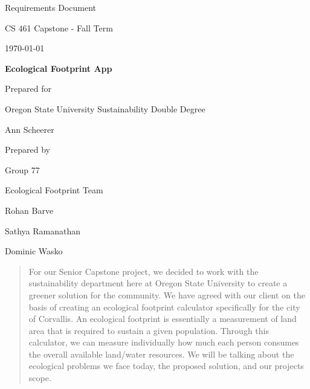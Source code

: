 \documentclass[onecolumn, draftclsnofoot,10pt, compsoc, tikz]{IEEEtran}
\def \CapstoneTeamName{		Ecological Footprint Team}
\def \CapstoneTeamNumber{		77}
\def \GroupMemberOne{			Rohan Barve}
\def \GroupMemberTwo{			Sathya Ramanathan}
\def \GroupMemberThree{			Dominic Wasko}
\def \CapstoneProjectName{		Ecological Footprint App}
\def \CapstoneSponsorCompany{	Oregon State University Sustainability Double Degree}
\def \CapstoneSponsorPerson{		Ann Scheerer}
\def \DocType{Requirements Document}
\newcommand{\NameSigPair}[1]{\par
\makebox[2.75in][r]{#1} \hfil 	\makebox[3.25in]{\makebox[2.25in]{\hrulefill} \hfill		\makebox[.75in]{\hrulefill}}
\par\vspace{-12pt} \textit{\tiny\noindent
\makebox[2.75in]{} \hfil		\makebox[3.25in]{\makebox[2.25in][r]{Signature} \hfill	\makebox[.75in][r]{Date}}}}
\renewcommand{\NameSigPair}[1]{#1}
\begin{document}
\begin{titlepage}
    \begin{singlespace}
        \hfill 
        \par\vspace{.2in}
        \centering
        \scshape{
	 \huge \DocType \par
            \huge CS 461 Capstone - Fall Term \par
            {\large\today}\par
            \vspace{.5in}
            \textbf{\Huge\CapstoneProjectName}\par
            \vfill
            {\large Prepared for}\par
            \Huge \CapstoneSponsorCompany\par
            \vspace{5pt}
            {\Large\NameSigPair{\CapstoneSponsorPerson}\par}
            {\large Prepared by }\par
            Group\CapstoneTeamNumber\par
            \CapstoneTeamName\par 
            \vspace{5pt}
            {\Large
                \NameSigPair{\GroupMemberOne}\par
                \NameSigPair{\GroupMemberTwo}\par
                \NameSigPair{\GroupMemberThree}\par
            }
            \vspace{20pt}
        }
        \begin{abstract}
        	For our Senior Capstone project, we decided to work with the sustainability department here at Oregon State University to create a greener solution for the community. 
	We have agreed with our client on the basis of creating an ecological footprint calculator specifically for the city of Corvallis.
	An ecological footprint is essentially a measurement of land area that is required to sustain a given population. 
	Through this calculator, we can measure individually how much each person consumes the overall available land/water resources. 
	We will be talking about the ecological problems we face today, the proposed solution, and our projects scope.
        \end{abstract}     
    \end{singlespace}
\end{titlepage}
\newpage
{}
\tableofcontents
\listoffigures
\listoftables
\clearpage
\end{document}
